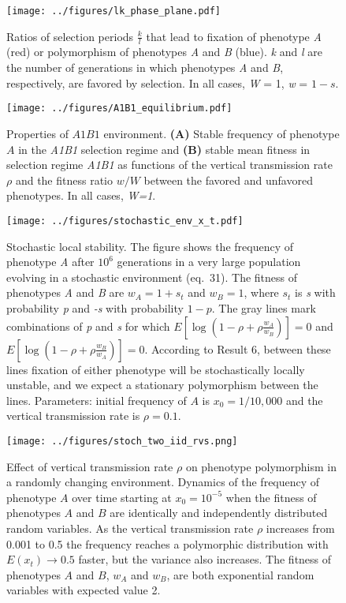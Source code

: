 \documentclass[]{article}
\begin{document}

\begin{figure}
\centering
\texttt{[image: ../figures/lk\_phase\_plane.pdf]}
\caption{Ratios of selection periods \(\frac{k}{l}\) that lead to
fixation of phenotype \emph{A} (red) or polymorphism of phenotypes
\emph{A} and \emph{B} (blue). \emph{k} and \emph{l} are the number of
generations in which phenotypes \emph{A} and \emph{B}, respectively, are favored by selection.
In all cases, \emph{W} = 1, \emph{w} = \(1-s\).}\label{fig:lk_phase_plane}
\end{figure}

\begin{figure}
\centering
\texttt{[image: ../figures/A1B1\_equilibrium.pdf]}
\caption{Properties of $A1B1$ environment.
\textbf{(A)} Stable frequency of phenotype $A$ in the \emph{A1B1} selection regime and \textbf{(B)} stable mean fitness in selection regime \emph{A1B1} as functions of the vertical transmission rate \(\rho\) and the fitness ratio \(w/W\) between the favored and unfavored phenotypes.
In all cases, \emph{W=1}.
}\label{fig:AkBl_equilibrium}
\end{figure}

\begin{figure}
\centering
\texttt{[image: ../figures/stochastic\_env\_x\_t.pdf]}
\caption{Stochastic local stability. 
The figure shows the frequency of phenotype \emph{A} after \(10^6\) generations in a very large population evolving in a stochastic environment (eq.\ 31).
The fitness of phenotypes \emph{A} and \emph{B} are \(w_A=1+s_t\) and \(w_B=1\),
where \(s_t\) is \emph{s} with probability \emph{p} and \emph{-s} with probability \(1-p\).
The gray lines mark combinations of \emph{p} and \emph{s} for which \(E[\log{(1-\rho+\rho\frac{w_A}{w_B})}]=0\) and \(E[\log{(1-\rho+\rho\frac{w_B}{w_A})}]=0\).
According to Result 6, between these lines fixation of either phenotype will be stochastically locally unstable, and we expect a stationary polymorphism between the lines.
Parameters: initial frequency of \(A\) is \(x_0=1/10,000\) and the vertical transmission rate is \(\rho=0.1\).}\label{fig:stochastic_env_x_t}
\end{figure}

\begin{figure}
\centering
\texttt{[image: ../figures/stoch\_two\_iid\_rvs.png]}
\caption{Effect of vertical transmission rate $\rho$ on phenotype polymorphism in a randomly changing environment. Dynamics of the frequency of phenotype \(A\) over time starting at \(x_0=10^{-5}\) when the fitness of phenotypes \(A\) and \(B\) are identically and independently distributed random variables.
As the vertical transmission rate \(\rho\) increases from 0.001 to 0.5 the frequency reaches a polymorphic distribution with \(E(x_t)\to0.5\) faster,
but the variance also increases.
The fitness of phenotypes \(A\) and \(B\), \(w_A\) and \(w_B\), are both exponential random variables with expected value 2.}\label{fig:stoch_two_iid_rvs}
\end{figure}
\end{document}

